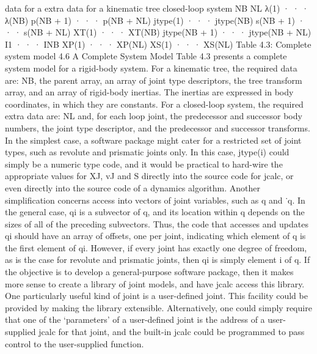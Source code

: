 data for a extra data for a kinematic tree closed-loop system NB NL λ(1) · · · λ(NB) p(NB + 1) · · · p(NB + NL) jtype(1) · · · jtype(NB) s(NB + 1) · · · s(NB + NL) XT(1) · · · XT(NB) jtype(NB + 1) · · · jtype(NB + NL) I1 · · · INB XP(1) · · · XP(NL) XS(1) · · · XS(NL) Table 4.3: Complete system model 4.6 A Complete System Model Table 4.3 presents a complete system model for a rigid-body system. For a kinematic tree, the required data are: NB, the parent array, an array of joint type descriptors, the tree transform array, and an array of rigid-body inertias. The inertias are expressed in body coordinates, in which they are constants. For a closed-loop system, the required extra data are: NL and, for each loop joint, the predecessor and successor body numbers, the joint type descriptor, and the predecessor and successor transforms. In the simplest case, a software package might cater for a restricted set of joint types, such as revolute and prismatic joints only. In this case, jtype(i) could simply be a numeric type code, and it would be practical to hard-wire the appropriate values for XJ, vJ and S directly into the source code for jcalc, or even directly into the source code of a dynamics algorithm. Another simplification concerns access into vectors of joint variables, such as q and ˙q. In the general case, qi is a subvector of q, and its location within q depends on the sizes of all of the preceding subvectors. Thus, the code that accesses and updates qi should have an array of offsets, one per joint, indicating which element of q is the first element of qi. However, if every joint has exactly one degree of freedom, as is the case for revolute and prismatic joints, then qi is simply element i of q. If the objective is to develop a general-purpose software package, then it makes more sense to create a library of joint models, and have jcalc access this library. One particularly useful kind of joint is a user-defined joint. This facility could be provided by making the library extensible. Alternatively, one could simply require that one of the ‘parameters’ of a user-defined joint is the address of a user-supplied jcalc for that joint, and the built-in jcalc could be programmed to pass control to the user-supplied function.
